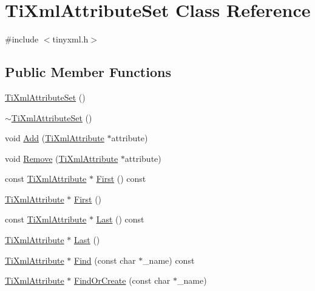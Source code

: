 \hypertarget{class_ti_xml_attribute_set}{}\section{Ti\+Xml\+Attribute\+Set Class Reference}
\label{class_ti_xml_attribute_set}


{\ttfamily \#include $<$tinyxml.\+h$>$}

\subsection*{Public Member Functions}
\begin{DoxyCompactItemize}
\item 
\hyperlink{class_ti_xml_attribute_set_a253c33b657cc85a07f7f060b02146c35}{Ti\+Xml\+Attribute\+Set} ()
\item 
\hyperlink{class_ti_xml_attribute_set_add463905dff96142a29fe16a01ecf28f}{$\sim$\+Ti\+Xml\+Attribute\+Set} ()
\item 
void \hyperlink{class_ti_xml_attribute_set_a745e50ddaae3bee93e4589321e0b9c1a}{Add} (\hyperlink{class_ti_xml_attribute}{Ti\+Xml\+Attribute} $\ast$attribute)
\item 
void \hyperlink{class_ti_xml_attribute_set_a924a73d071f2573f9060f0be57879c57}{Remove} (\hyperlink{class_ti_xml_attribute}{Ti\+Xml\+Attribute} $\ast$attribute)
\item 
const \hyperlink{class_ti_xml_attribute}{Ti\+Xml\+Attribute} $\ast$ \hyperlink{class_ti_xml_attribute_set_ae0636e88cedd4b09d61c451860f68598}{First} () const 
\item 
\hyperlink{class_ti_xml_attribute}{Ti\+Xml\+Attribute} $\ast$ \hyperlink{class_ti_xml_attribute_set_a99703bb08ca2aece2d7ef835de339ba0}{First} ()
\item 
const \hyperlink{class_ti_xml_attribute}{Ti\+Xml\+Attribute} $\ast$ \hyperlink{class_ti_xml_attribute_set_a7b3f3ccf39a97bc25539d3fcc540296a}{Last} () const 
\item 
\hyperlink{class_ti_xml_attribute}{Ti\+Xml\+Attribute} $\ast$ \hyperlink{class_ti_xml_attribute_set_ab4c4edfb2d74f6ea31aae096743bd6e0}{Last} ()
\item 
\hyperlink{class_ti_xml_attribute}{Ti\+Xml\+Attribute} $\ast$ \hyperlink{class_ti_xml_attribute_set_af3675cc2bfd0aea153cda1cfcdd1f77e}{Find} (const char $\ast$\+\_\+name) const 
\item 
\hyperlink{class_ti_xml_attribute}{Ti\+Xml\+Attribute} $\ast$ \hyperlink{class_ti_xml_attribute_set_a5e28f5d32f048fba85d04dc317495bdc}{Find\+Or\+Create} (const char $\ast$\+\_\+name)
\end{DoxyCompactItemize}


